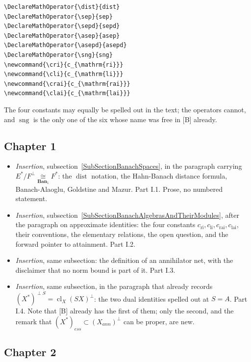 \documentclass[11pt]{article}
\theoremstyle{plain}
\theoremstyle{definition}
\newcommand{\isom}[1]{\mathrel{\mathop{\cong}\limits_{#1}}}
\DeclareMathOperator{\dist}{dist}
\DeclareMathOperator{\sep}{sep}
\DeclareMathOperator{\sepd}{sepd}
\DeclareMathOperator{\asep}{asep}
\DeclareMathOperator{\asepd}{asepd}
\DeclareMathOperator{\sng}{sng}
\newcommand{\cri}{c_{\mathrm{ri}}}
\newcommand{\cli}{c_{\mathrm{li}}}
\newcommand{\crai}{c_{\mathrm{rai}}}
\newcommand{\clai}{c_{\mathrm{lai}}}
\begin{document}
\begin{verbatim}
\DeclareMathOperator{\dist}{dist}
\DeclareMathOperator{\sep}{sep}
\DeclareMathOperator{\sepd}{sepd}
\DeclareMathOperator{\asep}{asep}
\DeclareMathOperator{\asepd}{asepd}
\DeclareMathOperator{\sng}{sng}
\newcommand{\cri}{c_{\mathrm{ri}}}
\newcommand{\cli}{c_{\mathrm{li}}}
\newcommand{\crai}{c_{\mathrm{rai}}}
\newcommand{\clai}{c_{\mathrm{lai}}}
\end{verbatim}

The four constants may equally be spelled out in the text; the operators cannot,
and $\sng$ is the only one of the six whose name was free in [B] already.

\subsection{Chapter 1}

\begin{itemize}
\item \emph{Insertion}, subsection~\ref{SubSectionBanachSpaces}, in the paragraph
carrying $E^*/F^\perp\isom{\mathbf{Ban}_1}F^*$: the $\dist$ notation, the
Hahn-Banach distance formula, Banach-Alaoglu, Goldstine and Mazur. Part I.1.
Prose, no numbered statement.

\item \emph{Insertion}, subsection~\ref{SubSectionBanachAlgebrasAndTheirModules},
after the paragraph on approximate identities: the four constants
$\cri,\cli,\crai,\clai$, their conventions, the elementary relations, the open
question, and the forward pointer to attainment. Part I.2.

\item \emph{Insertion}, same subsection: the definition of an annihilator net,
with the disclaimer that no norm bound is part of it. Part I.3.

\item \emph{Insertion}, same subsection, in the paragraph that already records
${(X^*)}^{\perp S}={\operatorname{cl}_X(SX)}^\perp$: the two dual identities
spelled out at $S=A$. Part I.4. Note that [B] already has the first of them; only
the second, and the remark that ${(X^*)}_{ess}\subset{(X_{ann})}^\perp$ can be
proper, are new.
\end{itemize}

\subsection{Chapter 2}
\end{document}
